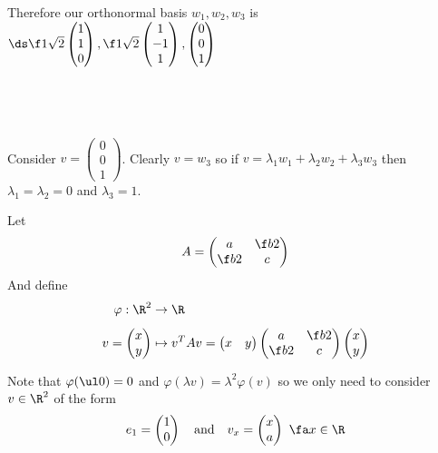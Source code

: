 \documentclass[a4paper]{article}
\begin{document}
Therefore our orthonormal basis $w_1, w_2, w_3$ is $\ds \f1{\sqrt2} \begin{pmatrix}1\\ 1\\ 0\end{pmatrix}, \f1{\sqrt2} \begin{pmatrix}1\\ -1\\ 1\end{pmatrix}, \begin{pmatrix}0\\ 0\\ 1\end{pmatrix}$

\subsection{~}

Consider $v = \begin{pmatrix}0\\ 0\\ 1\end{pmatrix}$. Clearly $v = w_3$ so if $v = \lambda_1 w_1 + \lambda_2 w_2 + \lambda_3 w_3$ then $\lambda_1 = \lambda_2 = 0$ and $\lambda_3 = 1$.



Let $$A = \begin{pmatrix} a & \f b2 \\ \f b2 & c \end{pmatrix}$$
And define \begin{align*}
\varphi : \R^2 &\to \R\\[1ex]
v = \begin{pmatrix} x \\ y \end{pmatrix} &\mapsto v^T A v = \begin{pmatrix} x & y \end{pmatrix} \begin{pmatrix} a & \f b2 \\ \f b2 & c \end{pmatrix} \begin{pmatrix} x \\ y \end{pmatrix}
\end{align*}

Note that $\varphi(\ul 0) = 0$ and $\varphi(\lambda v) = \lambda^2 \varphi(v)$ so we only need to consider $v \in \R^2$ of the form $$e_1 = \begin{pmatrix} 1 \\ 0 \end{pmatrix} \quad\text{and}\quad v_x = \begin{pmatrix} x \\ a \end{pmatrix}\ \fa x \in \R$$
\end{document}
